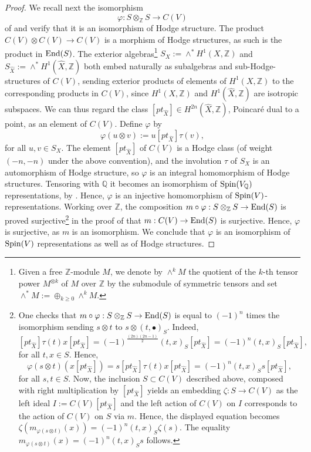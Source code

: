 \documentclass[12pt]{amsart}
\numberwithin{equation}{subsection}
\theoremstyle{plain}
\theoremstyle{definition}
\newcommand{\QQ}{{\mathbb Q}}
\newcommand{\ZZ}{{\mathbb Z}}
\newcommand{\Spin}{{\rm Spin}}
\newcommand{\End}{{\rm End}}
\begin{document}
\begin{proof}
We recall next the isomorphism 
\[
\varphi : S\otimes_\ZZ S\rightarrow C(V)
\]
of \cite[III.3.1]{chevalley} and verify that it is an isomorphism of Hodge structure.
The product  $C(V)\otimes C(V)\rightarrow C(V)$ is a morphism of Hodge structures, as such is the product in $\End(S)$. 
The exterior algebras\footnote{
Given a free $\ZZ$-module $M$, we denote by $\wedge^kM$ the quotient of the $k$-th tensor power $M^{\otimes k}$ of $M$ over $\ZZ$ by the submodule of symmetric tensors and set $\wedge^*M:=\oplus_{k\geq 0}\wedge^kM$.
} 
$S_X:=\wedge^*H^1(X,\ZZ)$ and $S_{\hat{X}}:=\wedge^* H^1(\hat{X},\ZZ)$ both embed naturally as subalgebras and sub-Hodge-structures of $C(V)$, sending exterior products of elements of $H^1(X,\ZZ)$ to the corresponding products in $C(V)$, since $H^1(X,\ZZ)$ and $H^1(\hat{X},\ZZ)$ are isotropic subspaces. We can thus regard the class $[pt_{\hat{X}}]\in H^{2n}(\hat{X},\ZZ)$, Poincar\'{e} dual to a point, as an element of $C(V)$. Define $\varphi$ by 
\begin{equation}
\label{eq-Chevalley-varphi}
\varphi(u\otimes v):= u[pt_{\hat{X}}]\tau(v),
\end{equation}
for all $u, v\in S_X$. The element $[pt_{\hat{X}}]$ of $C(V)$ is a Hodge class (of weight $(-n,-n)$ under the above convention), and the involution $\tau$ of $S_X$ is an automorphism of Hodge structure, so $\varphi$ is an integral homomorphism of Hodge structures. Tensoring with $\QQ$ it becomes an isomorphism of $\Spin(V_\QQ)$ representations, by  \cite[III.3.1]{chevalley}.
Hence, $\varphi$ is an injective homomorphism of $\Spin(V)$-representations.
Working over $\ZZ$, the composition $m\circ \varphi:S\otimes_\ZZ S\rightarrow \End(S)$ is proved surjective\footnote{
One checks that $m\circ\varphi:S\otimes_\ZZ S\rightarrow \End(S)$ is  equal to $(-1)^n$ times the isomorphism sending $s\otimes t$ to $s\otimes (t,\bullet)_S$. Indeed, 
$
[pt_{\hat{X}}]\tau(t)x[pt_{\hat{X}}]=
(-1)^{\frac{(2n)(2n-1)}{2}}(t,x)_S[pt_{\hat{X}}] =(-1)^n(t,x)_S[pt_{\hat{X}}],
$ 
for all $t,x\in S$.
Hence, 
\[
\varphi(s\otimes t)(x[pt_{\hat{X}}])=s[pt_{\hat{X}}]\tau(t)x[pt_{\hat{X}}]=(-1)^n(t,x)_Ss[pt_{\hat{X}}],
\] 
for all $s,t\in S$.
Now, the inclusion $S\subset C(V)$ described above, composed with right multiplication by $[pt_{\hat{X}}]$ yields an embedding $\zeta:S\rightarrow C(V)$ as the left ideal  $I:=C(V)[pt_{\hat{X}}]$ and the left action of $C(V)$ on $I$ corresponds to the action of $C(V)$ on $S$ via $m$. Hence, the displayed equation becomes
$\zeta(m_{\varphi(s\otimes t)}(x))=(-1)^n(t,x)_S\zeta(s).$ The equality 
$m_{\varphi(s\otimes t)}(x)=(-1)^n(t,x)_Ss$ follows.
} 
in the proof of \cite[Prop. 3.2.1(e)]{golyshev-luntz-orlov} that $m:C(V)\rightarrow\End(S)$ is surjective. Hence, $\varphi$ is surjective, as $m$ is an isomorphism. We conclude that $\varphi$ is an isomorphism of $\Spin(V)$ representations as well as of Hodge structures.


\end{proof}
\end{document}
